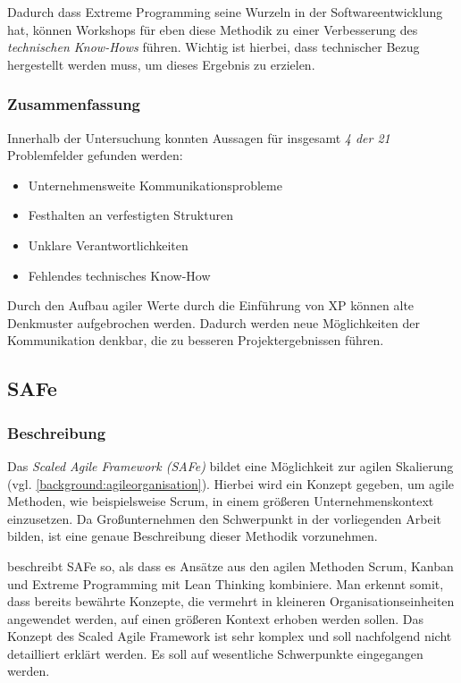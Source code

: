 Dadurch dass Extreme Programming seine Wurzeln in der Softwareentwicklung hat, können Workshops für eben diese Methodik zu einer Verbesserung des \textit{technischen Know-Hows} führen. Wichtig ist hierbei, dass technischer Bezug hergestellt werden muss, um dieses Ergebnis zu erzielen.


\subsubsection{Zusammenfassung}

Innerhalb der Untersuchung konnten Aussagen für insgesamt \textit{4 der 21} Problemfelder gefunden werden:

\begin{itemize}[noitemsep, topsep=0pt]
	\item Unternehmensweite Kommunikationsprobleme
	\item Festhalten an verfestigten Strukturen
	\item Unklare Verantwortlichkeiten
	\item Fehlendes technisches Know-How
\end{itemize}

Durch den Aufbau agiler Werte durch die Einführung von XP können alte Denkmuster aufgebrochen werden. Dadurch werden neue Möglichkeiten der Kommunikation denkbar, die zu besseren Projektergebnissen führen.

\subsection{SAFe}

\subsubsection{Beschreibung}

Das \textit{Scaled Agile Framework (SAFe)} bildet eine Möglichkeit zur agilen Skalierung (vgl. \ref{background:agileorganisation}). Hierbei wird ein Konzept gegeben, um agile Methoden, wie beispielsweise Scrum, in einem größeren Unternehmenskontext einzusetzen. Da Großunternehmen den Schwerpunkt in der vorliegenden Arbeit bilden, ist eine genaue Beschreibung dieser Methodik vorzunehmen.

 beschreibt SAFe so, als dass es Ansätze aus den agilen Methoden Scrum, Kanban und Extreme Programming mit Lean Thinking kombiniere. Man erkennt somit, dass bereits bewährte  Konzepte, die vermehrt in kleineren Organisationseinheiten angewendet werden, auf einen größeren Kontext erhoben werden sollen. Das Konzept des Scaled Agile Framework ist sehr komplex und soll nachfolgend nicht detailliert erklärt werden. Es soll auf wesentliche Schwerpunkte eingegangen werden.
 

